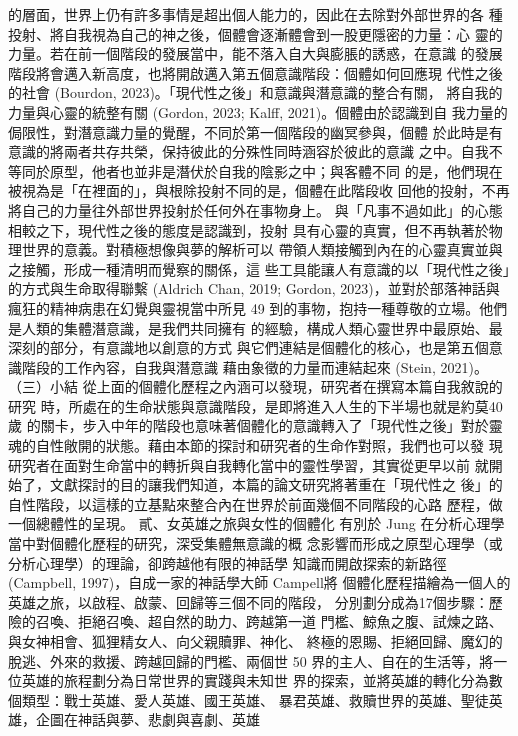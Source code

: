 的層面，世界上仍有許多事情是超出個人能力的，因此在去除對外部世界的各
種投射、將自我視為自己的神之後，個體會逐漸體會到一股更隱密的力量：心
靈的力量。若在前一個階段的發展當中，能不落入自大與膨脹的誘惑，在意識
的發展階段將會邁入新高度，也將開啟邁入第五個意識階段：個體如何回應現
代性之後的社會 (Bourdon, 2023)。「現代性之後」和意識與潛意識的整合有關，
將自我的力量與心靈的統整有關 (Gordon, 2023; Kalff, 2021)。個體由於認識到自
我力量的侷限性，對潛意識力量的覺醒，不同於第一個階段的幽冥參與，個體
於此時是有意識的將兩者共存共榮，保持彼此的分殊性同時涵容於彼此的意識
之中。自我不等同於原型，他者也並非是潛伏於自我的陰影之中；與客體不同
的是，他們現在被視為是「在裡面的」，與根除投射不同的是，個體在此階段收
回他的投射，不再將自己的力量往外部世界投射於任何外在事物身上。 
與「凡事不過如此」的心態相較之下，現代性之後的態度是認識到，投射
具有心靈的真實，但不再執著於物理世界的意義。對積極想像與夢的解析可以
帶領人類接觸到內在的心靈真實並與之接觸，形成一種清明而覺察的關係，這
些工具能讓人有意識的以「現代性之後」的方式與生命取得聯繫 (Aldrich Chan, 
2019; Gordon, 2023)，並對於部落神話與瘋狂的精神病患在幻覺與靈視當中所見
49 
到的事物，抱持一種尊敬的立場。他們是人類的集體潛意識，是我們共同擁有
的經驗，構成人類心靈世界中最原始、最深刻的部分，有意識地以創意的方式
與它們連結是個體化的核心，也是第五個意識階段的工作內容，自我與潛意識
藉由象徵的力量而連結起來 (Stein, 2021)。 
（三）小結 
從上面的個體化歷程之內涵可以發現，研究者在撰寫本篇自我敘說的研究
時，所處在的生命狀態與意識階段，是即將進入人生的下半場也就是約莫40歲
的關卡，步入中年的階段也意味著個體化的意識轉入了「現代性之後」對於靈
魂的自性敞開的狀態。藉由本節的探討和研究者的生命作對照，我們也可以發
現研究者在面對生命當中的轉折與自我轉化當中的靈性學習，其實從更早以前
就開始了，文獻探討的目的讓我們知道，本篇的論文研究將著重在「現代性之
後」的自性階段，以這樣的立基點來整合內在世界於前面幾個不同階段的心路
歷程，做一個總體性的呈現。 
貳、女英雄之旅與女性的個體化 
有別於 Jung 在分析心理學當中對個體化歷程的研究，深受集體無意識的概
念影響而形成之原型心理學（或分析心理學）的理論，卻跨越他有限的神話學
知識而開啟探索的新路徑 (Campbell, 1997)，自成一家的神話學大師 Campell將
個體化歷程描繪為一個人的英雄之旅，以啟程、啟蒙、回歸等三個不同的階段，
分別劃分成為17個步驟：歷險的召喚、拒絕召喚、超自然的助力、跨越第一道
門檻、鯨魚之腹、試煉之路、與女神相會、狐狸精女人、向父親贖罪、神化、
終極的恩賜、拒絕回歸、魔幻的脫逃、外來的救援、跨越回歸的門檻、兩個世
50 
界的主人、自在的生活等，將一位英雄的旅程劃分為日常世界的實踐與未知世
界的探索，並將英雄的轉化分為數個類型：戰士英雄、愛人英雄、國王英雄、
暴君英雄、救贖世界的英雄、聖徒英雄，企圖在神話與夢、悲劇與喜劇、英雄
